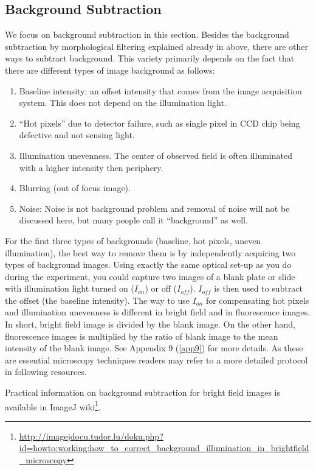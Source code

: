 \subsection{Background Subtraction}
\label{subsec:BackgroundSubtraction}

We focus on background subtraction in this section. Besides the background subtraction by morphological filtering explained already in above, there are other ways to subtract background. This variety primarily depends on the fact that there are different types of image background as follows:

\begin{enumerate}
\item Baseline intensity: an offset intensity that comes from the image acquisition system. This does not depend on the illumination light.  
\item ``Hot pixels'' due to detector failure, such as single pixel in CCD chip being defective and not sensing light. 
\item Illumination unevenness. The center of observed field is often illuminated with a higher intensity then periphery. 
\item Blurring (out of focus image).
\item Noise: Noise is not background problem and removal of noise will not be discussed here, but many people call it ``background'' as well. 
\end{enumerate}

For the first three types of backgrounds (baseline, hot pixels, uneven illumination), the best way to remove them is by independently acquiring two types of background images. Using exactly the same optical set-up as you do during the experiment, you could capture two images of a blank plate or slide with illumination light turned on ($I_{on}$) or off ($I_{off}$). $I_{off}$ is then used to subtract the offset (the baseline intensity). The way to use $I_{on}$ for compensating  hot pixels and illumination unevenness is different in bright field and in fluorescence images. In short, bright field image is divided by the blank image. On the other hand, fluorescence images is multiplied by the ratio of blank image to the mean intensity of the blank image. See Appendix 9 (\ref{app9}) for more details. As these are essential microscopy techniques readers may refer to a more detailed protocol in following resources. 

Practical information on background subtraction for bright field images is
available in ImageJ wiki\footnote{\url{http://imagejdocu.tudor.lu/doku.php?id=howto:working:how_to_correct_background_illumination_in_brightfield_microscopy}}. 

